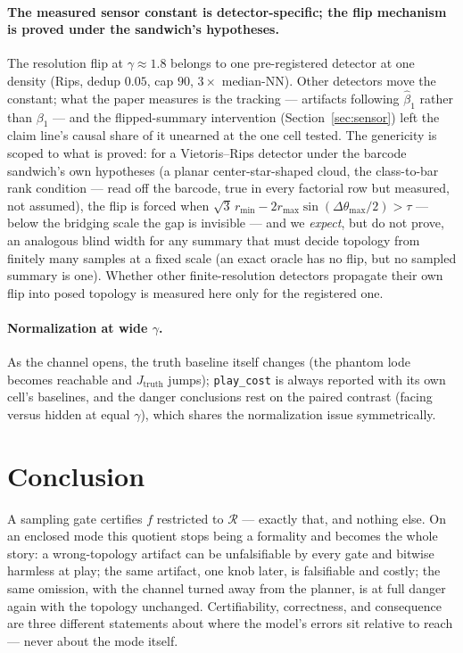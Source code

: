 \documentclass[11pt]{article}
\theoremstyle{remark}
\begin{document}
\paragraph{The measured sensor constant is detector-specific; the flip
mechanism is proved under the sandwich's hypotheses.} The
resolution flip at $\gamma \approx 1.8$ belongs to one pre-registered
detector at one density (Rips, dedup $0.05$, cap $90$, $3\times$
median-NN). Other detectors move the constant; what the paper measures
is the tracking --- artifacts following $\hat\beta_1$ rather than
$\beta_1$ --- and the flipped-summary intervention
(Section~\ref{sec:sensor}) left the claim line's causal share of it
unearned at the one cell tested. The genericity is scoped to what is
proved: for a Vietoris--Rips detector under the barcode sandwich's own
hypotheses (a planar center-star-shaped cloud, the class-to-bar rank
condition --- read off the barcode, true in every factorial row but
measured, not assumed), the flip is forced when
$\sqrt3\,r_{\min} - 2 r_{\max}\sin(\Delta\theta_{\max}/2) > \tau$ ---
below the bridging scale the gap is invisible --- and we \emph{expect},
but do not prove, an analogous blind width for any summary that must
decide topology from finitely many samples at a fixed scale (an exact
oracle has no flip, but no sampled summary is one). Whether other
finite-resolution detectors propagate their own flip into posed
topology is measured here only for the registered one.

\paragraph{Normalization at wide $\gamma$.} As the channel opens, the
truth baseline itself changes (the phantom lode becomes reachable and
$J_{\mathrm{truth}}$ jumps); \texttt{play\_cost} is always reported with
its own cell's baselines, and the danger conclusions rest on the paired
contrast (facing versus hidden at equal $\gamma$), which shares the
normalization issue symmetrically.

\section{Conclusion}
\label{sec:conclusion}

A sampling gate certifies $f$ restricted to $\mathcal{R}$ --- exactly
that, and nothing else. On an enclosed mode this quotient stops being a
formality and becomes the whole story: a wrong-topology artifact can be
unfalsifiable by every gate and bitwise harmless at play; the same
artifact, one knob later, is falsifiable and costly; the same omission,
with the channel turned away from the planner, is at full danger again
with the topology unchanged. Certifiability, correctness, and consequence
are three different statements about where the model's errors sit relative
to reach --- never about the mode itself.
\end{document}
